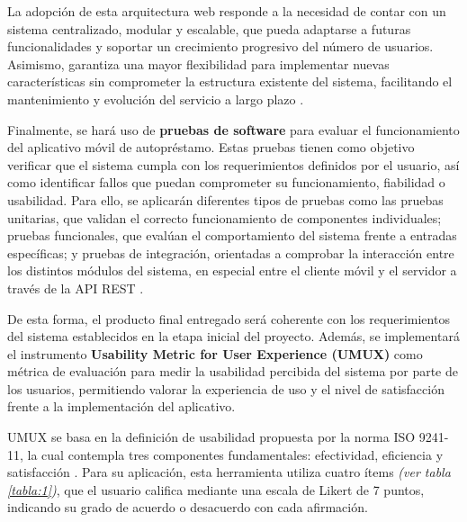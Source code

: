 \documentclass[spanish]{ieee_upb}
\begin{document}
La adopción de esta arquitectura web responde a la necesidad de contar con un sistema centralizado, modular y escalable, que pueda adaptarse a futuras funcionalidades y soportar un crecimiento progresivo del número de usuarios. Asimismo, garantiza una mayor flexibilidad para implementar nuevas características sin comprometer la estructura existente del sistema, facilitando el mantenimiento y evolución del servicio a largo plazo \cite{guillen2019arquitectura}.\vspace{0.3 cm}

Finalmente, se hará uso de \textbf{pruebas de software} para evaluar el funcionamiento del aplicativo móvil de autopréstamo. Estas pruebas tienen como objetivo verificar que el sistema cumpla con los requerimientos definidos por el usuario, así como identificar fallos que puedan comprometer su funcionamiento, fiabilidad o usabilidad. Para ello, se aplicarán diferentes tipos de pruebas como las pruebas unitarias, que validan el correcto funcionamiento de componentes individuales; pruebas funcionales, que evalúan el comportamiento del sistema frente a entradas específicas; y pruebas de integración, orientadas a comprobar la interacción entre los distintos módulos del sistema, en especial entre el cliente móvil y el servidor a través de la API REST \cite{kaner1999testing}.\vspace{0.3 cm}

De esta forma, el producto final entregado será coherente con los requerimientos del sistema establecidos en la etapa inicial del proyecto. Además, se implementará el instrumento \textbf{Usability Metric for User Experience (UMUX)} como métrica de evaluación para medir la usabilidad percibida del sistema por parte de los usuarios, permitiendo valorar la experiencia de uso y el nivel de satisfacción frente a la implementación del aplicativo.\vspace{0.3 cm}

UMUX se basa en la definición de usabilidad propuesta por la norma ISO 9241-11, la cual contempla tres componentes fundamentales: efectividad, eficiencia y satisfacción \cite{umux}. Para su aplicación, esta herramienta utiliza cuatro ítems \textit{(ver tabla \ref{tabla:1})}, que el usuario califica mediante una escala de Likert de 7 puntos, indicando su grado de acuerdo o desacuerdo con cada afirmación.

\end{document}
